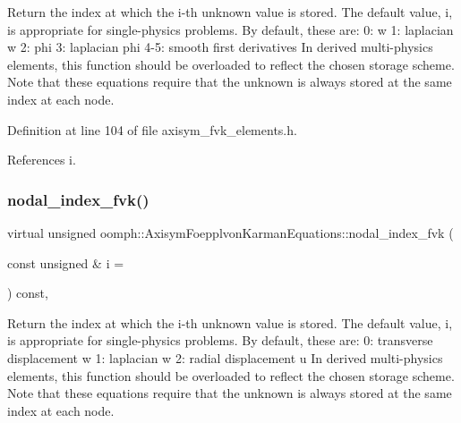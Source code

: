 Return the index at which the i-\/th unknown value is stored. The default value, i, is appropriate for single-\/physics problems. By default, these are\+: 0\+: w 1\+: laplacian w 2\+: phi 3\+: laplacian phi 4-\/5\+: smooth first derivatives In derived multi-\/physics elements, this function should be overloaded to reflect the chosen storage scheme. Note that these equations require that the unknown is always stored at the same index at each node. 



Definition at line 104 of file axisym\+\_\+fvk\+\_\+elements.\+h.



References i.

\mbox{\label{classoomph_1_1AxisymFoepplvonKarmanEquations_a481e2bbbd87723e7b91a79bcb83e361c}} 
\subsubsection{\texorpdfstring{nodal\+\_\+index\+\_\+fvk()}{nodal\_index\_fvk()}\hspace{0.1cm}{\footnotesize\ttfamily [2/2]}}
{\footnotesize\ttfamily virtual unsigned oomph\+::\+Axisym\+Foepplvon\+Karman\+Equations\+::nodal\+\_\+index\+\_\+fvk (\begin{DoxyParamCaption}\item[{const unsigned \&}]{i = {} }\end{DoxyParamCaption}) const\hspace{0.3cm}{\ttfamily [inline]}, {\ttfamily [virtual]}}



Return the index at which the i-\/th unknown value is stored. The default value, i, is appropriate for single-\/physics problems. By default, these are\+: 0\+: transverse displacement w 1\+: laplacian w 2\+: radial displacement u In derived multi-\/physics elements, this function should be overloaded to reflect the chosen storage scheme. Note that these equations require that the unknown is always stored at the same index at each node. 



